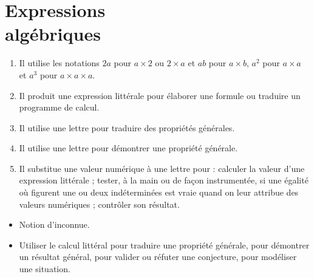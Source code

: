 \themaN
\graphicspath{{../../S08_Expressions_algebriques/Images/}}

\chapter{Expressions\\algébriques}
\label{S08}


\begin{autoeval}
   \small
   \begin{enumerate}
      \item Il utilise les notations $2a$ pour $a\times2$ ou $2\times a$ et $ab$ pour $a\times b$, $a^2$ pour $a\times a$ et $a^3$ pour $a\times a\times a$.
      \item Il produit une expression littérale pour élaborer une formule ou traduire un programme de calcul.
      \item Il utilise une lettre pour traduire des propriétés générales.
      \item Il utilise une lettre pour démontrer une propriété générale.
      \item Il substitue une valeur numérique à une lettre pour : calculer la valeur d’une expression littérale ; tester, à la main ou de façon instrumentée, si une égalité où figurent une ou deux indéterminées est vraie quand on leur attribue des valeurs numériques ; contrôler son résultat.
   \end{enumerate}
\end{autoeval}

\begin{prerequis}
   \begin{itemize}
      \item Notion d'inconnue.
      \item[\com] Utiliser le calcul littéral pour traduire une propriété générale, pour démontrer un résultat général, pour valider ou réfuter une conjecture, pour modéliser une situation.
   \end{itemize}
\end{prerequis}

\vfill

